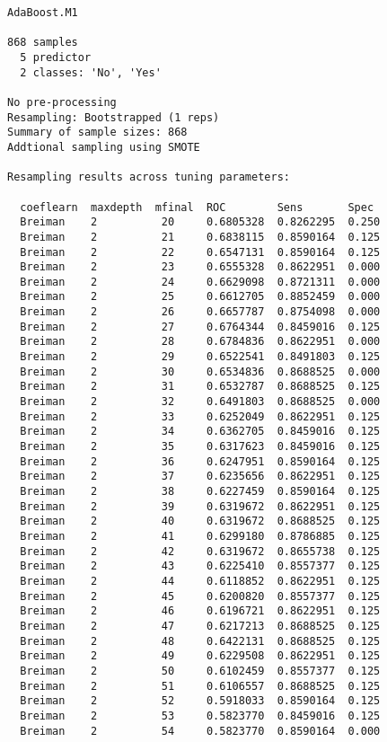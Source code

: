 \documentclass[11pt]{article}
\begin{document}
    \begin{Verbatim}[commandchars=\\\{\}]
AdaBoost.M1 

868 samples
  5 predictor
  2 classes: 'No', 'Yes' 

No pre-processing
Resampling: Bootstrapped (1 reps) 
Summary of sample sizes: 868 
Addtional sampling using SMOTE

Resampling results across tuning parameters:

  coeflearn  maxdepth  mfinal  ROC        Sens       Spec 
  Breiman    2          20     0.6805328  0.8262295  0.250
  Breiman    2          21     0.6838115  0.8590164  0.125
  Breiman    2          22     0.6547131  0.8590164  0.125
  Breiman    2          23     0.6555328  0.8622951  0.000
  Breiman    2          24     0.6629098  0.8721311  0.000
  Breiman    2          25     0.6612705  0.8852459  0.000
  Breiman    2          26     0.6657787  0.8754098  0.000
  Breiman    2          27     0.6764344  0.8459016  0.125
  Breiman    2          28     0.6784836  0.8622951  0.000
  Breiman    2          29     0.6522541  0.8491803  0.125
  Breiman    2          30     0.6534836  0.8688525  0.000
  Breiman    2          31     0.6532787  0.8688525  0.125
  Breiman    2          32     0.6491803  0.8688525  0.000
  Breiman    2          33     0.6252049  0.8622951  0.125
  Breiman    2          34     0.6362705  0.8459016  0.125
  Breiman    2          35     0.6317623  0.8459016  0.125
  Breiman    2          36     0.6247951  0.8590164  0.125
  Breiman    2          37     0.6235656  0.8622951  0.125
  Breiman    2          38     0.6227459  0.8590164  0.125
  Breiman    2          39     0.6319672  0.8622951  0.125
  Breiman    2          40     0.6319672  0.8688525  0.125
  Breiman    2          41     0.6299180  0.8786885  0.125
  Breiman    2          42     0.6319672  0.8655738  0.125
  Breiman    2          43     0.6225410  0.8557377  0.125
  Breiman    2          44     0.6118852  0.8622951  0.125
  Breiman    2          45     0.6200820  0.8557377  0.125
  Breiman    2          46     0.6196721  0.8622951  0.125
  Breiman    2          47     0.6217213  0.8688525  0.125
  Breiman    2          48     0.6422131  0.8688525  0.125
  Breiman    2          49     0.6229508  0.8622951  0.125
  Breiman    2          50     0.6102459  0.8557377  0.125
  Breiman    2          51     0.6106557  0.8688525  0.125
  Breiman    2          52     0.5918033  0.8590164  0.125
  Breiman    2          53     0.5823770  0.8459016  0.125
  Breiman    2          54     0.5823770  0.8590164  0.000

\end{Verbatim}
\end{document}
